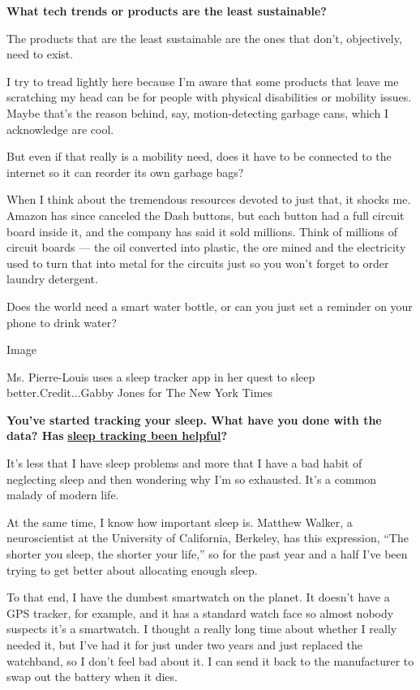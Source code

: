 \textbf{What tech trends or products are the least sustainable?}

The products that are the least sustainable are the ones that don't,
objectively, need to exist.

I try to tread lightly here because I'm aware that some products that
leave me scratching my head can be for people with physical disabilities
or mobility issues. Maybe that's the reason behind, say,
motion-detecting garbage cans, which I acknowledge are cool.

But even if that really is a mobility need, does it have to be connected
to the internet so it can reorder its own garbage bags?

When I think about the tremendous resources devoted to just that, it
shocks me. Amazon has since canceled the Dash buttons, but each button
had a full circuit board inside it, and the company has said it sold
millions. Think of millions of circuit boards --- the oil converted into
plastic, the ore mined and the electricity used to turn that into metal
for the circuits just so you won't forget to order laundry detergent.

Does the world need a smart water bottle, or can you just set a reminder
on your phone to drink water?

Image

Ms. Pierre-Louis uses a sleep tracker app in her quest to sleep
better.Credit...Gabby Jones for The New York Times

\textbf{You've started tracking your sleep. What have you done with the
data? Has}
\textbf{\href{https://www.nytimes3xbfgragh.onion/2019/07/17/technology/personaltech/sleep-tracking-devices-apps.html}{sleep
tracking been helpful}?}

It's less that I have sleep problems and more that I have a bad habit of
neglecting sleep and then wondering why I'm so exhausted. It's a common
malady of modern life.

At the same time, I know how important sleep is. Matthew Walker, a
neuroscientist at the University of California, Berkeley, has this
expression, ``The shorter you sleep, the shorter your life,'' so for the
past year and a half I've been trying to get better about allocating
enough sleep.

To that end, I have the dumbest smartwatch on the planet. It doesn't
have a GPS tracker, for example, and it has a standard watch face so
almost nobody suspects it's a smartwatch. I thought a really long time
about whether I really needed it, but I've had it for just under two
years and just replaced the watchband, so I don't feel bad about it. I
can send it back to the manufacturer to swap out the battery when it
dies.

